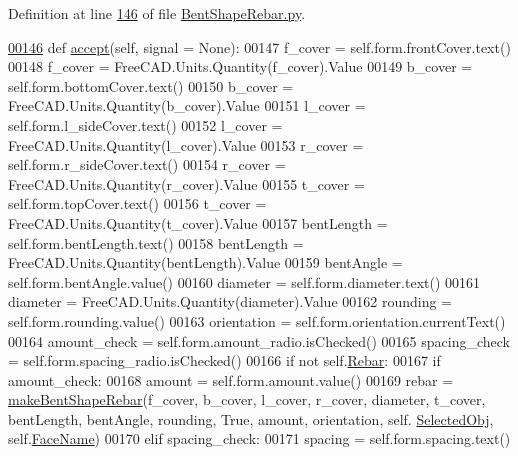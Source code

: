 Definition at line \hyperlink{BentShapeRebar_8py_source_l00146}{146} of file \hyperlink{BentShapeRebar_8py_source}{Bent\+Shape\+Rebar.\+py}.


\begin{DoxyCode}
\hypertarget{classBentShapeRebar_1_1__BentShapeRebarTaskPanel.tex_l00146}{}\hyperlink{classBentShapeRebar_1_1__BentShapeRebarTaskPanel_afdcf71c6a16711a535971366558ea918}{00146}     \textcolor{keyword}{def }\hyperlink{classBentShapeRebar_1_1__BentShapeRebarTaskPanel_afdcf71c6a16711a535971366558ea918}{accept}(self, signal = None):
00147         f\_cover = self.form.frontCover.text()
00148         f\_cover = FreeCAD.Units.Quantity(f\_cover).Value
00149         b\_cover = self.form.bottomCover.text()
00150         b\_cover = FreeCAD.Units.Quantity(b\_cover).Value
00151         l\_cover = self.form.l\_sideCover.text()
00152         l\_cover = FreeCAD.Units.Quantity(l\_cover).Value
00153         r\_cover = self.form.r\_sideCover.text()
00154         r\_cover = FreeCAD.Units.Quantity(r\_cover).Value
00155         t\_cover = self.form.topCover.text()
00156         t\_cover = FreeCAD.Units.Quantity(t\_cover).Value
00157         bentLength = self.form.bentLength.text()
00158         bentLength = FreeCAD.Units.Quantity(bentLength).Value
00159         bentAngle = self.form.bentAngle.value()
00160         diameter = self.form.diameter.text()
00161         diameter = FreeCAD.Units.Quantity(diameter).Value
00162         rounding = self.form.rounding.value()
00163         orientation = self.form.orientation.currentText()
00164         amount\_check = self.form.amount\_radio.isChecked()
00165         spacing\_check = self.form.spacing\_radio.isChecked()
00166         \textcolor{keywordflow}{if} \textcolor{keywordflow}{not} self.\hyperlink{classBentShapeRebar_1_1__BentShapeRebarTaskPanel_aae8fd4e66d675c566d0afcee0af2341f}{Rebar}:
00167             \textcolor{keywordflow}{if} amount\_check:
00168                 amount = self.form.amount.value()
00169                 rebar = \hyperlink{namespaceBentShapeRebar_aac46779d3e1905db5a3788917f6e2476}{makeBentShapeRebar}(f\_cover, b\_cover, l\_cover, r\_cover, diameter, 
      t\_cover, bentLength, bentAngle, rounding, \textcolor{keyword}{True}, amount, orientation, self.
      \hyperlink{classBentShapeRebar_1_1__BentShapeRebarTaskPanel_a24d363ab6c058ce4436a2b29e9c0b279}{SelectedObj}, self.\hyperlink{classBentShapeRebar_1_1__BentShapeRebarTaskPanel_a499514a87885d4c9462e3c6dc314ec9c}{FaceName})
00170             \textcolor{keywordflow}{elif} spacing\_check:
00171                 spacing = self.form.spacing.text()

\end{DoxyCode}

